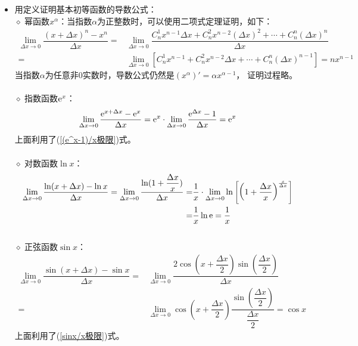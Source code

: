\begin{itemize}[leftmargin=\inteval{\myitemleftmargin}pt,itemsep=
   \inteval{\myitemitempsep}pt,topsep=\inteval{\myitemtopsep}pt]
\item 用定义证明基本初等函数的导数公式：\\
$\diamond$ 幂函数$ x^{\alpha} $：当指数$ \alpha $为正整数时，可以使用二项式定理证明，如下：
\begin{align*}
    \lim_{\Delta x \to 0}\dfrac{(x+\Delta x)^n-x^n}{\Delta x} 
    =&\lim_{\Delta x \to 0} \dfrac{C_n^1x^{n-1}\Delta x+C_n^2x^{n-2}(\Delta x)^2
        +\cdots + C_n^n (\Delta x)^n}{\Delta x} \\
    =&\lim_{\Delta x \to 0}\left[ C_n^1x^{n-1}+C_n^2x^{n-2}\Delta x +\cdots+C_n^n 
    (\Delta x)^{n-1}\right] = nx^{n-1} 
\end{align*}
当指数$ \alpha $为任意非0实数时，导数公式仍然是$ (x^{\alpha})'=\alpha x^{\alpha-1} $，
证明过程略。\\
\\
$\diamond$ 指数函数$ \mathrm{e}^x $：
\begin{align*}
    \lim_{\Delta x \to 0}\dfrac{\mathrm{e}^{x+\Delta x}-\mathrm{e}^x}{\Delta x}=
    \mathrm{e}^x \cdot \lim_{\Delta x \to 0}\dfrac{\mathrm{e}^{\Delta x}-1}{\Delta x} =\mathrm{e}^x
\end{align*}
上面利用了(\ref{(e^x-1)/x极限})式。\\
\\
$\diamond$ 对数函数$ \ln x $：
\begin{align*}
    \lim_{\Delta x \to 0}\dfrac{\ln(x+\Delta x)-\ln x}{\Delta x}
    =\lim_{\Delta x \to 0}\dfrac{\ln(1+\dfrac{\Delta x}{x})}{\Delta x} 
    =&\dfrac{1}{x}\cdot \lim_{\Delta x \to 0}\ln\left[ \left( 1+\dfrac{\Delta x}{x}\right)^{\frac{x}{\Delta x}} \right] \\
    =&\dfrac{1}{x}\ln \mathrm{e}=\dfrac{1}{x}
\end{align*} \\
$\diamond$ 正弦函数$ \sin x $：
\begin{align*}
    \lim_{\Delta x \to 0}\dfrac{\sin(x+\Delta x)-\sin x}{\Delta x}
    =&\lim_{\Delta x \to 0}\dfrac{2\cos(x+\dfrac{\Delta x}{2})\sin(\dfrac{\Delta x}{2})}{\Delta x} \\
    =&\lim_{\Delta x \to 0}\cos\left( x+\dfrac{\Delta x}{2}\right)  \dfrac{\sin(\dfrac{\Delta x}{2})}
    {\dfrac{\Delta x}{2}} =\cos x
\end{align*}
上面利用了(\ref{sinx/x极限})式。


\end{itemize}
